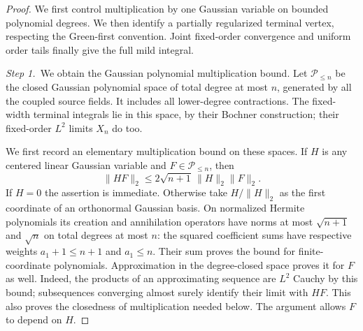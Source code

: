 \documentclass[12pt,oneside,openany]{book}
\numberwithin{equation}{section}
\theoremstyle{nogostyle}
\theoremstyle{definition}
\begin{document}
\begin{proof}
  We first control multiplication by one Gaussian variable on bounded
  polynomial degrees. We then identify a partially regularized terminal
  vertex, respecting the Green-first convention. Joint fixed-order convergence
  and uniform order tails finally give the full mild integral.


  \medskip
  \noindent\textit{Step 1.~}We obtain the Gaussian polynomial multiplication
  bound.
  Let $\mathscr{P}_{\le n}$ be the closed Gaussian polynomial space of total
  degree at most $n$, generated by all the coupled source fields. It includes
  all lower-degree contractions. The fixed-width terminal integrals lie in this
  space, by their Bochner construction; their fixed-order $L^2$ limits $X_n$ do
  too.

  We first record an elementary multiplication bound on these spaces. If $H$ is
  any centered linear Gaussian variable and $F \in \mathscr{P}_{\le n}$, then
  \begin{equation}\label{E:occupied-multiplication}
    \|HF\|_2\le2\sqrt{n+1}\,\|H\|_2\|F\|_2.
  \end{equation}
  If $H = 0$ the assertion is immediate. Otherwise take $H/\|H\|_2$ as the first
  coordinate of an orthonormal Gaussian basis. On normalized Hermite polynomials
  its creation and annihilation operators have norms at most $\sqrt{n+1}$ and
  $\sqrt n$ on total degrees at most $n$: the squared coefficient sums have
  respective weights $a_1+1 \le n+1$ and $a_1 \le n$. Their sum proves the bound
  for finite-coordinate polynomials. Approximation in the degree-closed space
  proves it for $F$ as well. Indeed, the products of an approximating sequence
  are $L^2$ Cauchy by this bound; subsequences converging almost surely identify
  their limit with $HF$. This also proves the closedness of multiplication
  needed below. The argument allows $F$ to depend on $H$.



\end{proof}
\end{document}
